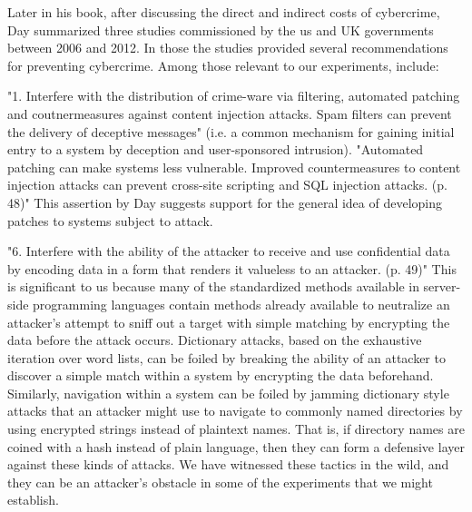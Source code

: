 Later in his book, after discussing the direct and indirect costs of \gls{cybercrime}, Day summarized three studies commissioned by the \gls{us} and UK governments between 2006 and 2012.  In those the studies provided several recommendations for preventing \gls{cybercrime}.  Among those relevant to our experiments, include:

"1.  Interfere with the distribution of crime-ware via filtering, automated patching and coutnermeasures against content injection attacks.  Spam filters can prevent the delivery of deceptive messages" (i.e. a common mechanism for gaining initial entry to a system by deception and user-sponsored intrusion). "Automated patching can make systems less vulnerable.  Improved countermeasures to content injection attacks can prevent cross-site scripting and SQL injection attacks. (p. 48)"  This assertion by Day suggests support for the general idea of developing patches to systems subject to \gls{attack}.

"6.  Interfere with the ability of the attacker to receive and use confidential data by encoding data in a form that renders it valueless to an attacker. (p. 49)" This is significant to us because many of the standardized methods available in server-side programming languages contain methods already available to neutralize an attacker's attempt to sniff out a target with simple matching by encrypting the data before the \gls{attack} occurs.  Dictionary attacks, based on the exhaustive iteration over word lists, can be foiled by breaking the ability of an attacker to discover a simple match within a system by encrypting the data beforehand.  Similarly, navigation within a system can be foiled by jamming dictionary style attacks that an attacker might use to navigate to commonly named directories by using encrypted strings instead of plaintext names.  That is, if directory names are coined with a \gls{hash} instead of plain language, then they can form a defensive layer against these kinds of attacks.  We have witnessed these tactics in the wild, and they can be an attacker's obstacle in some of the experiments that we might establish.

